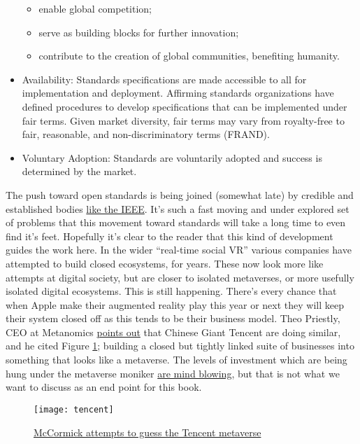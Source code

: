 \begin{itemize}
\begin{itemize}
\item enable global competition;
\item serve as building blocks for further innovation; 
\item contribute to the creation of global communities, benefiting humanity.
\end{itemize}
\item Availability: Standards specifications are made accessible to all for implementation and deployment. Affirming standards organizations have defined procedures to develop specifications that can be implemented under fair terms. Given market diversity, fair terms may vary from royalty-free to fair, reasonable, and non-discriminatory terms (FRAND).
\item Voluntary Adoption: Standards are voluntarily adopted and success is determined by the market.
\end{itemize}
The push toward open standards is being joined (somewhat late) by credible and established bodies \href{https://spectrum.ieee.org/laying-foundation-for-extended-reality}{like the IEEE}. It's such a fast moving and under explored set of problems that this movement toward standards will take a long time to even find it's feet.
Hopefully it's clear to the reader that this kind of development guides the work here. In the wider ``real-time social VR'' various companies have attempted to build closed ecosystems, for years. These now look more like attempts at digital society, but are closer to isolated metaverses, or more usefully isolated digital ecosystems. This is still happening. There's every chance that when Apple make their augmented reality play this year or next they will keep their system closed off as this tends to be their business model. Theo Priestly, CEO at Metanomics \href{https://www.linkedin.com/feed/update/urn:li:activity:6977366421034967040/}{points out} that Chinese Giant Tencent are doing similar, and he cited Figure \ref{fig:tencent}; building a closed but tightly linked suite of businesses into something that looks like a metaverse. The levels of investment which are being hung under the metaverse moniker \href{https://www.scmp.com/tech/policy/article/3194092/chinas-iphone-production-hub-henan-bets-its-future-metaverse}{are mind blowing}, but that is not what we want to discuss as an end point for this book.
\begin{figure}
  \centering
    \texttt{[image: tencent]}
  \caption{\href{https://www.notboring.co/p/tencents-dreams}{McCormick attempts to guess the Tencent metaverse}}
  \label{fig:tencent}
\end{figure}
